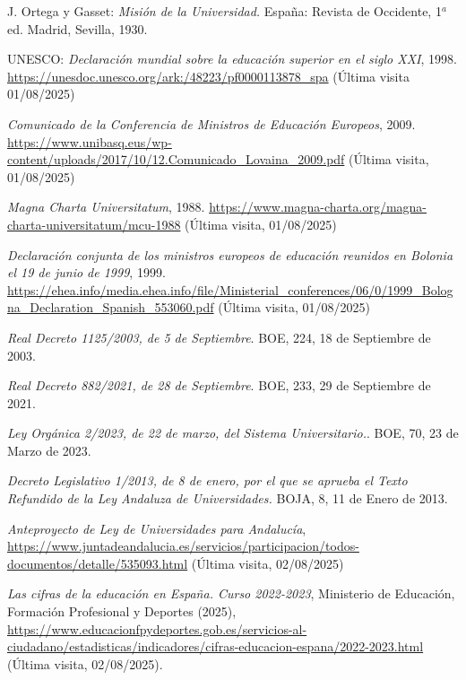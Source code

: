 \documentclass[a4paper,12pt,twoside]{article}
\begin{document}
\begin{thebibliography}{99} %

J. Ortega y Gasset: \textit{Misión de la Universidad.} España: Revista de Occidente, 1$^a$ ed.
Madrid, Sevilla, 1930.

UNESCO: \textit{Declaración mundial sobre la educación superior en el siglo XXI},
1998. \url{https://unesdoc.unesco.org/ark:/48223/pf0000113878_spa} (Última visita 01/08/2025)

 \textit{Comunicado de la Conferencia de Ministros de Educación Europeos}, 2009. \url{https://www.unibasq.eus/wp-content/uploads/2017/10/12.Comunicado_Lovaina_2009.pdf} (Última visita, 01/08/2025)

 \textit{Magna Charta Universitatum}, 1988. \url{https://www.magna-charta.org/magna-charta-universitatum/mcu-1988} (Última visita, 01/08/2025)

 \textit{Declaración conjunta de los ministros europeos de educación reunidos en Bolonia el 19 de junio de 1999}, 1999. \url{https://ehea.info/media.ehea.info/file/Ministerial_conferences/06/0/1999_Bologna_Declaration_Spanish_553060.pdf} (Última visita, 01/08/2025)

 \textit{Real Decreto 1125/2003, de 5 de Septiembre}. BOE, 224, 18 de Septiembre de 2003.

 \textit{Real Decreto 882/2021, de 28 de Septiembre}. BOE, 233, 29 de Septiembre de 2021.

 \textit{Ley Orgánica 2/2023, de 22 de marzo, del Sistema Universitario.}. BOE, 70, 23 de Marzo de 2023.

 \textit{Decreto Legislativo 1/2013, de 8 de enero, por el que se aprueba el Texto Refundido de la Ley Andaluza de Universidades.} BOJA, 8, 11 de Enero de 2013.

 \textit{Anteproyecto de Ley de Universidades para Andalucía}, \url{https://www.juntadeandalucia.es/servicios/participacion/todos-documentos/detalle/535093.html} (Última visita, 02/08/2025)

 \textit{Las cifras de la educación en España. Curso 2022-2023}, Ministerio de Educación, Formación Profesional y Deportes (2025), \url{https://www.educacionfpydeportes.gob.es/servicios-al-ciudadano/estadisticas/indicadores/cifras-educacion-espana/2022-2023.html} (Última visita, 02/08/2025).


\end{thebibliography}
\end{document}
